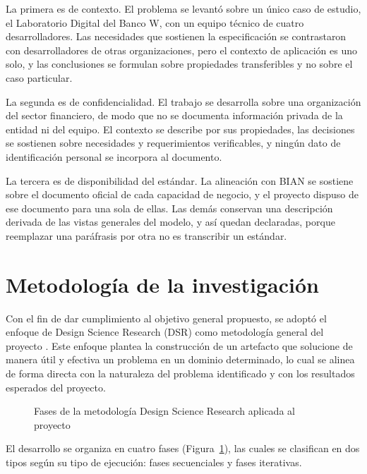 La primera es de contexto. El problema se levantó sobre un único caso de
estudio, el Laboratorio Digital del Banco W, con un equipo técnico de cuatro
desarrolladores. Las necesidades que sostienen la especificación se
contrastaron con desarrolladores de otras organizaciones, pero el contexto de
aplicación es uno solo, y las conclusiones se formulan sobre propiedades
transferibles y no sobre el caso particular.

La segunda es de confidencialidad. El trabajo se desarrolla sobre una
organización del sector financiero, de modo que no se documenta información
privada de la entidad ni del equipo. El contexto se describe por sus
propiedades, las decisiones se sostienen sobre necesidades y requerimientos
verificables, y ningún dato de identificación personal se incorpora al
documento.

La tercera es de disponibilidad del estándar. La alineación con BIAN se
sostiene sobre el documento oficial de cada capacidad de negocio, y el
proyecto dispuso de ese documento para una sola de ellas. Las demás conservan
una descripción derivada de las vistas generales del modelo, y así quedan
declaradas, porque reemplazar una paráfrasis por otra no es transcribir un
estándar.

\section{Metodología de la investigación}
Con el fin de dar cumplimiento al objetivo general propuesto, se adoptó el enfoque de Design Science Research (DSR) como metodología general del proyecto \citep{Wieringa2014}. Este enfoque plantea la construcción de un artefacto que solucione de manera útil y efectiva un problema en un dominio determinado, lo cual se alinea de forma directa con la naturaleza del problema identificado y con los resultados esperados del proyecto.

\begin{figure}[H]
  \scalebox{0.54}{}
  \caption{Fases de la metodología Design Science Research aplicada al proyecto}
  \label{fig:metodologia}
\end{figure}
\pagebreak

El desarrollo se organiza en cuatro fases (Figura~\ref{fig:metodologia}), las cuales se clasifican en dos tipos según su tipo de ejecución: fases secuenciales y fases iterativas.

